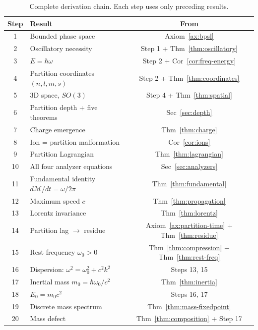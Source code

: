 \documentclass[twocolumn,10pt,a4paper]{article}
\theoremstyle{definition}
\theoremstyle{remark}
\newcommand{\Depth}{\mathcal{M}}
\begin{document}
\begin{table}[H]
\centering
\caption{Complete derivation chain. Each step uses only preceding results.}
\label{tab:chain}
\small
\begin{tabular}{clc}
\toprule
\textbf{Step} & \textbf{Result} & \textbf{From} \\
\midrule
1 & Bounded phase space & Axiom~\ref{ax:bpsl} \\
2 & Oscillatory necessity & Step 1 + Thm~\ref{thm:oscillatory} \\
3 & $E = \hbar\omega$ & Step 2 + Cor~\ref{cor:freq-energy} \\
4 & Partition coordinates $(n,l,m,s)$ & Step 2 + Thm~\ref{thm:coordinates} \\
5 & 3D space, $SO(3)$ & Step 4 + Thm~\ref{thm:spatial} \\
6 & Partition depth + five theorems & Sec~\ref{sec:depth} \\
7 & Charge emergence & Thm~\ref{thm:charge} \\
8 & Ion = partition malformation & Cor~\ref{cor:ions} \\
9 & Partition Lagrangian & Thm~\ref{thm:lagrangian} \\
10 & All four analyzer equations & Sec~\ref{sec:analyzers} \\
11 & Fundamental identity $d\Depth/dt = \omega/2\pi$ & Thm~\ref{thm:fundamental} \\
12 & Maximum speed $c$ & Thm~\ref{thm:propagation} \\
13 & Lorentz invariance & Thm~\ref{thm:lorentz} \\
14 & Partition lag $\to$ residue & Axiom~\ref{ax:partition-time} + Thm~\ref{thm:residue} \\
15 & Rest frequency $\omega_0 > 0$ & Thm~\ref{thm:compression} + Thm~\ref{thm:rest-freq} \\
16 & Dispersion: $\omega^2 = \omega_0^2 + c^2k^2$ & Steps 13, 15 \\
17 & Inertial mass $m_0 = \hbar\omega_0/c^2$ & Thm~\ref{thm:inertia} \\
18 & $E_0 = m_0c^2$ & Steps 16, 17 \\
19 & Discrete mass spectrum & Thm~\ref{thm:mass-fixedpoint} \\
20 & Mass defect & Thm~\ref{thm:composition} + Step 17 \\
\bottomrule
\end{tabular}
\end{table}

\end{document}
